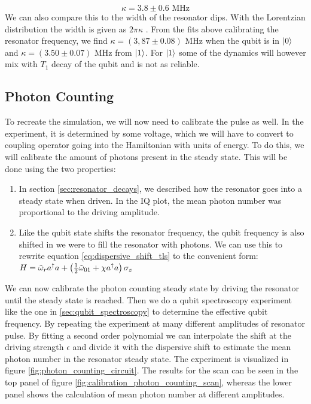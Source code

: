 \begin{equation}
    \kappa = 3.8 \pm 0.6 \text{ MHz}
\end{equation}
We can also compare this to the width of the resonator dips. With the Lorentzian distribution the width is given as $2 \pi \kappa$ \cite{krantz_quantum_2019}. From the fits above calibrating the resonator frequency, we find  $\kappa = (3,87 \pm 0.08) \text{ MHz}$ when the qubit is in $\ket{0}$ and $\kappa = (3.50 \pm 0.07) \text{ MHz}$ from $\ket{1}$. For $\ket{1}$ some of the dynamics will however mix with $T_1$ decay of the qubit and is not as reliable.   

\subsection{Photon Counting}
To recreate the simulation, we will now need to calibrate the pulse as well. In the experiment, it is determined by some voltage, which we will have to convert to coupling operator going into the Hamiltonian with units of energy. To do this, we will calibrate the amount of photons present in the steady state. This will be done using the two properties:
\begin{enumerate}
    \item In section \ref{sec:resonator_decays}, we described how the resonator goes into a steady state when driven. In the IQ plot, the mean photon number was proportional to the driving amplitude. 
    \item Like the qubit state shifts the resonator frequency, the qubit frequency is also shifted in we were to fill the resonator with photons. We can use this to rewrite equation \ref{eq:dispersive_shift_tls} to the convenient form: $H = \Tilde{\omega}_r a^\dagger a  + \left(\frac12 \Tilde{\omega}_{01} + \chi a^\dagger a\right)  \sigma_z$
\end{enumerate}
We can now calibrate the photon counting steady state by driving the resonator until the steady state is reached. Then we do a qubit spectroscopy experiment like the one in \ref{sec:qubit_spectroscopy} to determine the effective qubit frequency. By repeating the experiment at many different amplitudes of resonator pulse. By fitting a second order polynomial we can interpolate the shift at the driving strength $\epsilon$ and divide it with the dispersive shift to estimate the mean photon number in the resonator steady state. The experiment is visualized in figure \ref{fig:photon_counting_circuit}. The results for the scan can be seen in the top panel of figure \ref{fig:calibration_photon_counting_scan}, whereas the lower panel shows the calculation of mean photon number at different amplitudes.  

